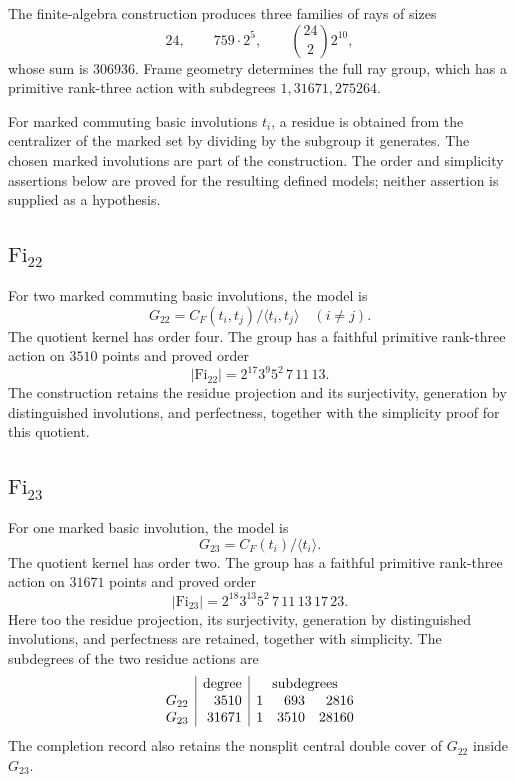 \documentclass[11pt]{article}
\numberwithin{equation}{section}
\theoremstyle{definition}
\newcommand{\Fi}{\mathrm{Fi}}
\begin{document}
The finite-algebra construction produces three families of rays of sizes
\[
 24,\qquad 759\cdot2^5,\qquad \binom{24}{2}2^{10},
\]
whose sum is $306936$. Frame geometry determines the full ray group,
which has a primitive rank-three action with subdegrees
$1,31671,275264$.

For marked commuting basic involutions $t_i$, a residue is obtained
from the centralizer of the marked set by dividing by the subgroup
it generates. The chosen marked involutions are part of the
construction. The order and simplicity assertions below are proved
for the resulting defined models; neither assertion is supplied
as a hypothesis.

\subsection{\texorpdfstring{$\Fi_{22}$}{Fi22}}

For two marked commuting basic involutions, the model is
\[
 G_{22}=C_F(t_i,t_j)/\langle t_i,t_j\rangle\quad(i\ne j).
\]
The quotient kernel has order four. The group has a faithful primitive
rank-three action on $3510$ points and proved order
\[
 |\Fi_{22}|=2^{17}3^9 5^2\,7\,11\,13.
\]
The construction retains the residue projection and its surjectivity,
generation by distinguished involutions, and perfectness, together
with the simplicity proof for this quotient.

\subsection{\texorpdfstring{$\Fi_{23}$}{Fi23}}

For one marked basic involution, the model is
\[
 G_{23}=C_F(t_i)/\langle t_i\rangle.
\]
The quotient kernel has order two. The group has a faithful primitive
rank-three action on $31671$ points and proved order
\[
 |\Fi_{23}|=2^{18}3^{13}5^2\,7\,11\,13\,17\,23.
\]
Here too the residue projection, its surjectivity, generation by
distinguished involutions, and perfectness are retained, together
with simplicity. The subdegrees of the two residue actions are
\[
\begin{array}{c|r|rrr}
 & \text{degree} & \multicolumn{3}{c}{\text{subdegrees}}\\
 G_{22} & 3510 & 1 & 693 & 2816\\
 G_{23} & 31671 & 1 & 3510 & 28160
\end{array}
\]
The completion record also retains the nonsplit central double cover
of $G_{22}$ inside $G_{23}$.
\end{document}
